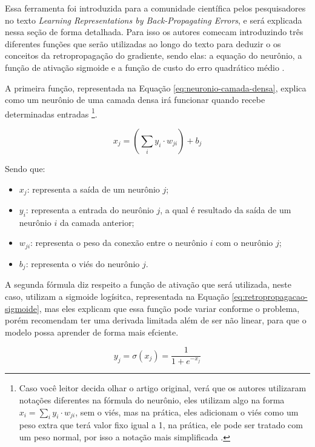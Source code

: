 Essa ferramenta foi introduzida para a comunidade científica pelos pesquisadores \textcite{BackpropagationArticle} no texto \textit{Learning Representations by Back-Propagating Errors}, e será explicada nessa seção de forma detalhada. Para isso os autores comecam introduzindo três diferentes funções que serão utilizadas ao longo do texto para deduzir o os conceitos da retropropagação do gradiente, sendo elas: a equação do neurônio, a função de ativação sigmoide e a função de custo do erro quadrático médio \parencite{BackpropagationArticle}.

A primeira função, representada na Equação \ref{eq:neuronio-camada-densa}, explica como um neurônio de uma camada densa irá funcionar quando recebe determinadas entradas \footnote{Caso você leitor decida olhar o artigo original, verá que os autores utilizaram notações diferentes na fórmula do neurônio, eles utilizam algo na forma $x_i = \sum_i y_i \cdot w_{ji}$, sem o viés, mas na prática, eles adicionam o viés como um peso extra que terá valor fixo igual a 1, na prática, ele pode ser tratado com um peso normal, por isso a notação mais simplificada \parencite{BackpropagationArticle}.}.

\begin{equation}
    x_j = (\sum_i y_i \cdot w_{ji}) + b_j
    \label{eq:neuronio-camada-densa}
\end{equation}

Sendo que:

\begin{itemize}
    \item $x_j$: representa a saída de um neurônio $j$;
    \item $y_i$: representa a entrada do neurônio $j$, a qual é resultado da saída de um neurônio $i$ da camada anterior;
    \item $w_{ji}$: representa o peso da conexão entre o neurônio $i$ com o neurônio $j$;
    \item $b_j$: representa o viés do neurônio $j$.
\end{itemize}

A segunda fórmula diz respeito a função de ativação que será utilizada, neste caso, \textcite{BackpropagationArticle} utilizam a sigmoide logísitca, representada na Equação \ref{eq:retropropagacao-sigmoide}, mas eles explicam que essa função pode variar conforme o problema, porém recomendam ter uma derivada limitada além de ser não linear, para que o modelo possa aprender de forma mais efciente.

\begin{equation}
    y_j = \sigma(x_j) = \frac{1}{1 + e^{-x_j}}
    \label{eq:retropropagacao-sigmoide}
\end{equation}

